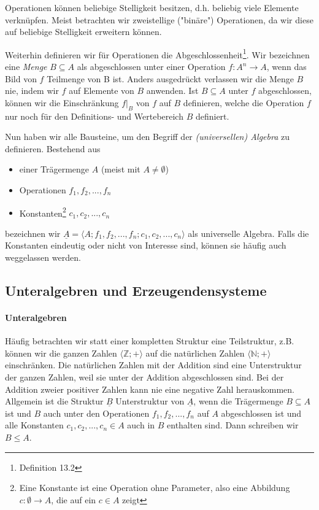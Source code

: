 \documentclass{scrartcl}
\begin{document}
Operationen können beliebige Stelligkeit besitzen, d.h. beliebig viele Elemente verknüpfen. Meist betrachten wir zweistellige ("binäre") Operationen, da wir diese auf beliebige
Stelligkeit erweitern können.

Weiterhin definieren wir für Operationen die Abgeschlossenheit\footnote{Definition 13.2}. Wir bezeichnen eine \emph{Menge} $B \subseteq A$ als abgeschlossen unter einer Operation $f: A^n \to A$,
wenn das Bild von $f$ Teilmenge von B ist.
Anders ausgedrückt verlassen wir die Menge $B$ nie, indem wir $f$ auf Elemente von $B$ anwenden. Ist $B \subseteq A$ unter $f$ abgeschlossen, 
können wir die Einschränkung $f|_ B$ von $f$ auf $B$ definieren, welche die Operation $f$ nur noch für den Definitions- und Wertebereich $B$ definiert.

Nun haben wir alle Bausteine, um den Begriff der \emph{(universellen) Algebra} zu definieren. Bestehend aus

\begin{itemize}
    \item einer Trägermenge $A$ (meist mit $A \ne \emptyset$)
    \item Operationen $f_1, f_2, ..., f_n$
    \item Konstanten\footnote{Eine Konstante ist eine Operation ohne Parameter, also eine Abbildung $c: \emptyset \to A$, die auf ein $c \in A$ zeigt} $c_1, c_2, ..., c_n$
\end{itemize}

bezeichnen wir $\underline{A} = \langle A; f_1, f_2, ..., f_n; c_1, c_2, ..., c_n \rangle$ als universelle Algebra. Falls die Konstanten eindeutig oder nicht von Interesse sind,
können sie häufig auch weggelassen werden.

\subsection{Unteralgebren und Erzeugendensysteme}

\paragraph{Unteralgebren}
Häufig betrachten wir statt einer kompletten Struktur eine Teilstruktur, z.B. können wir die ganzen Zahlen $\langle \mathbb{Z}; + \rangle$ auf die natürlichen Zahlen
$\langle \mathbb{N}; + \rangle$ einschränken. Die natürlichen Zahlen mit der Addition sind eine Unterstruktur der ganzen Zahlen, weil sie unter der Addition abgeschlossen sind.
Bei der Addition zweier positiver Zahlen kann nie eine negative Zahl herauskommen. Allgemein ist die Struktur $\underline{B}$ Unterstruktur von $\underline{A}$, wenn die
Trägermenge $B \subseteq A$ ist und $B$ auch unter den Operationen $f_1, f_2, ..., f_n$ auf $A$ abgeschlossen ist und alle Konstanten $c_1, c_2, ..., c_n \in A$ auch in $B$
enthalten sind. Dann schreiben wir $B \le A$.    
\end{document}
